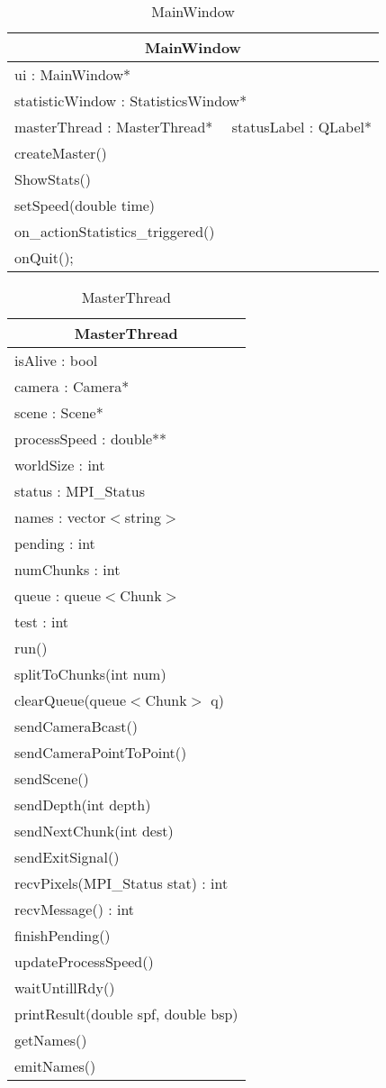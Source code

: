 \begin{longtable}{|p{16cm}|}
    \caption{MainWindow} \label{tab:MainWindow} \\ \hline
    \multicolumn{1}{|c|}{MainWindow} \\ \hline
    ui : MainWindow* \\
    statisticWindow : StatisticsWindow* \\
    masterThread : MasterThread* \ \
    statusLabel : QLabel* \\ \hline
    createMaster() \\
    ShowStats() \\
    setSpeed(double time) \\
    on\_actionStatistics\_triggered() \\
    onQuit(); \\ \hline
\end{longtable}


\begin{longtable}{|p{16cm}|}
    \caption{MasterThread} \label{tab:MasterThread} \\ \hline
    \multicolumn{1}{|c|}{MasterThread} \\ \hline
    isAlive : bool \\
    camera : Camera* \\
    scene : Scene* \\
    processSpeed : double** \\
    worldSize : int \\
    status : MPI\_Status \\
    names : vector$<$string$>$ \\
    pending : int \\
    numChunks : int \\
    queue : queue$<$Chunk$>$ \\
    test : int \\
    \hline
	run() \\
	splitToChunks(int num) \\
	clearQueue(queue$<$Chunk$>$ q) \\
    sendCameraBcast() \\
    sendCameraPointToPoint() \\
    sendScene() \\
    sendDepth(int depth) \\
    sendNextChunk(int dest) \\
    sendExitSignal() \\
    recvPixels(MPI\_Status stat) : int \\
    recvMessage() : int \\
    finishPending() \\
    updateProcessSpeed() \\
    waitUntillRdy() \\
    printResult(double spf, double bsp) \\
    getNames() \\
    emitNames() \\
	\hline
\end{longtable}


